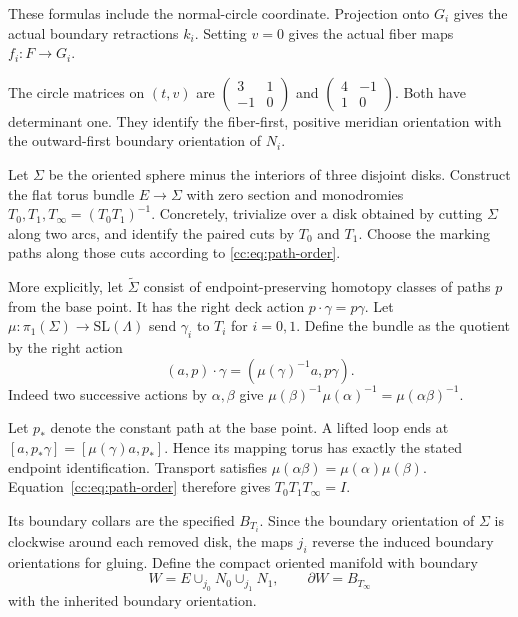 These formulas include the normal-circle coordinate.
Projection onto $G_i$ gives the actual boundary retractions $k_i$.
Setting $v=0$ gives the actual fiber maps $f_i:F\to G_i$.

The circle matrices on $(t,v)$ are
$\left(\begin{smallmatrix}3&1\\-1&0\end{smallmatrix}\right)$ and
$\left(\begin{smallmatrix}4&-1\\1&0\end{smallmatrix}\right)$.
Both have determinant one. They identify the fiber-first, positive
meridian orientation with the outward-first boundary orientation of $N_i$.

Let $\Sigma$ be the oriented sphere minus the interiors of three disjoint disks.
Construct the flat torus bundle $E\to\Sigma$ with zero section and monodromies
$T_0,T_1,T_\infty=(T_0T_1)^{-1}$.
Concretely, trivialize over a disk obtained by cutting $\Sigma$ along two
arcs, and identify the paired cuts by $T_0$ and $T_1$.
Choose the marking paths along those cuts according to
\eqref{cc:eq:path-order}.

More explicitly, let $\widetilde\Sigma$ consist of endpoint-preserving
homotopy classes of paths $p$ from the base point.
It has the right deck action $p\cdot\gamma=p\gamma$.
Let $\mu:\pi_1(\Sigma)\to\mathrm{SL}(\Lambda)$ send
$\gamma_i$ to $T_i$ for $i=0,1$.
Define the bundle as the quotient by the right action
\[
(a,p)\cdot\gamma=(\mu(\gamma)^{-1}a,p\gamma).
\]
Indeed two successive actions by $\alpha,\beta$ give
$\mu(\beta)^{-1}\mu(\alpha)^{-1}=\mu(\alpha\beta)^{-1}$.

Let $p_*$ denote the constant path at the base point.
A lifted loop ends at $[a,p_*\gamma]=[\mu(\gamma)a,p_*]$.
Hence its mapping torus has exactly the stated endpoint identification.
Transport satisfies $\mu(\alpha\beta)=\mu(\alpha)\mu(\beta)$.
Equation~\eqref{cc:eq:path-order} therefore gives
$T_0T_1T_\infty=I$.

Its boundary collars are the specified $B_{T_i}$.
Since the boundary orientation of $\Sigma$ is clockwise around each
removed disk, the maps $j_i$ reverse the induced boundary orientations
for gluing. Define the compact oriented manifold with boundary
\begin{equation}\label{cc:eq:W}
W=E\mathop{\cup}_{j_0}N_0\mathop{\cup}_{j_1}N_1,
\qquad \partial W=B_{T_\infty}
\end{equation}
with the inherited boundary orientation.

